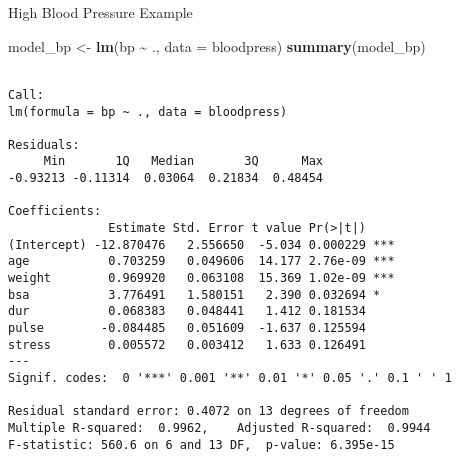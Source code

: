 \documentclass[
  ignorenonframetext,
]{beamer}
\newenvironment{Shaded}{\begin{snugshade}}{\end{snugshade}}
\newcommand{\AttributeTok}[1]{\textcolor[rgb]{0.13,0.29,0.53}{#1}}
\newcommand{\FunctionTok}[1]{\textcolor[rgb]{0.13,0.29,0.53}{\textbf{#1}}}
\newcommand{\NormalTok}[1]{#1}
\newcommand{\OtherTok}[1]{\textcolor[rgb]{0.56,0.35,0.01}{#1}}
\newcommand{\SpecialCharTok}[1]{\textcolor[rgb]{0.81,0.36,0.00}{\textbf{#1}}}
\begin{document}
\begin{frame}[fragile]{High Blood Pressure Example}
\protect\hypertarget{high-blood-pressure-example-2}{}
\scriptsize

\begin{Shaded}
\begin{Highlighting}[]
\NormalTok{model\_bp }\OtherTok{\textless{}{-}} \FunctionTok{lm}\NormalTok{(bp }\SpecialCharTok{\textasciitilde{}}\NormalTok{ ., }\AttributeTok{data =}\NormalTok{ bloodpress)}
\FunctionTok{summary}\NormalTok{(model\_bp)}
\end{Highlighting}
\end{Shaded}

\begin{verbatim}

Call:
lm(formula = bp ~ ., data = bloodpress)

Residuals:
     Min       1Q   Median       3Q      Max 
-0.93213 -0.11314  0.03064  0.21834  0.48454 

Coefficients:
              Estimate Std. Error t value Pr(>|t|)    
(Intercept) -12.870476   2.556650  -5.034 0.000229 ***
age           0.703259   0.049606  14.177 2.76e-09 ***
weight        0.969920   0.063108  15.369 1.02e-09 ***
bsa           3.776491   1.580151   2.390 0.032694 *  
dur           0.068383   0.048441   1.412 0.181534    
pulse        -0.084485   0.051609  -1.637 0.125594    
stress        0.005572   0.003412   1.633 0.126491    
---
Signif. codes:  0 '***' 0.001 '**' 0.01 '*' 0.05 '.' 0.1 ' ' 1

Residual standard error: 0.4072 on 13 degrees of freedom
Multiple R-squared:  0.9962,    Adjusted R-squared:  0.9944 
F-statistic: 560.6 on 6 and 13 DF,  p-value: 6.395e-15
\end{verbatim}

\normalsize
\end{frame}
\end{document}
